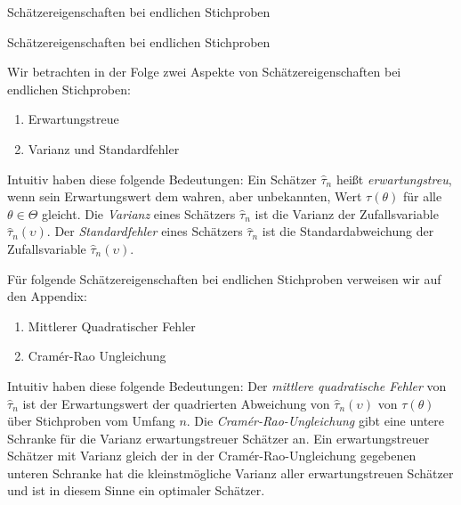 \documentclass[
  8pt,
  ignorenonframetext,
]{beamer}
\providecommand{\tightlist}{%
  \setlength{\itemsep}{0pt}\setlength{\parskip}{0pt}}
\newcommand{\ups} {\upsilon}
\begin{document}
\begin{frame}{Schätzereigenschaften bei endlichen Stichproben}
\protect\hypertarget{schuxe4tzereigenschaften-bei-endlichen-stichproben}{}
\justifying

Schätzereigenschaften bei endlichen Stichproben

\footnotesize

Wir betrachten in der Folge zwei Aspekte von Schätzereigenschaften bei
endlichen Stichproben:

\begin{enumerate}
[(1)]
\tightlist
\item
  Erwartungstreue
\item
  Varianz und Standardfehler
\end{enumerate}

Intuitiv haben diese folgende Bedeutungen: Ein Schätzer \(\hat{\tau}_n\)
heißt \emph{erwartungstreu}, wenn sein Erwartungswert dem wahren, aber
unbekannten, Wert \(\tau(\theta)\) für alle \(\theta \in \Theta\)
gleicht. Die \emph{Varianz} eines Schätzers \(\hat{\tau}_n\) ist die
Varianz der Zufallsvariable \(\hat{\tau}_n(\ups)\). Der
\emph{Standardfehler} eines Schätzers \(\hat{\tau}_n\) ist die
Standardabweichung der Zufallsvariable \(\hat{\tau}_n(\ups)\).

Für folgende Schätzereigenschaften bei endlichen Stichproben verweisen
wir auf den Appendix:

\begin{enumerate}
[(1)]
\tightlist
\item
  Mittlerer Quadratischer Fehler
\item
  Cramér-Rao Ungleichung
\end{enumerate}

Intuitiv haben diese folgende Bedeutungen: Der \emph{mittlere
quadratische Fehler} von \(\hat{\tau}_n\) ist der Erwartungswert der
quadrierten Abweichung von \(\hat{\tau}_n(\ups)\) von \(\tau(\theta)\)
über Stichproben vom Umfang \(n\). Die \emph{Cramér-Rao-Ungleichung}
gibt eine untere Schranke für die Varianz erwartungstreuer Schätzer an.
Ein erwartungstreuer Schätzer mit Varianz gleich der in der
Cramér-Rao-Ungleichung gegebenen unteren Schranke hat die
kleinstmögliche Varianz aller erwartungstreuen Schätzer und ist in
diesem Sinne ein optimaler Schätzer.
\end{frame}
\end{document}
